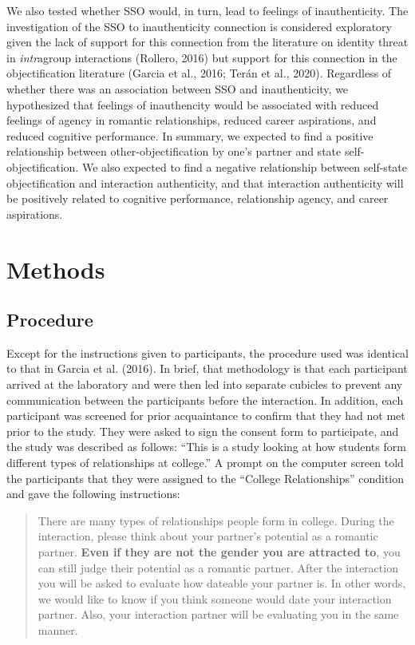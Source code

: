 \documentclass[man]{apa6}
\begin{document}
We also tested whether SSO would, in turn, lead to feelings of
inauthenticity. The investigation of the SSO to inauthenticity
connection is considered exploratory given the lack of support for this
connection from the literature on identity threat in \emph{intr}agroup
interactions (Rollero, 2016) but support for this connection in the
objectification literature (Garcia et al., 2016; Terán et al., 2020).
Regardless of whether there was an association between SSO and
inauthenticity, we hypothesized that feelings of inauthencity would be
associated with reduced feelings of agency in romantic relationships,
reduced career aspirations, and reduced cognitive performance. In
summary, we expected to find a positive relationship between
other-objectification by one's partner and state self-objectification.
We also expected to find a negative relationship between self-state
objectification and interaction authenticity, and that interaction
authenticity will be positively related to cognitive performance,
relationship agency, and career aspirations.

\section{Methods}\label{methods}

\subsection{Procedure}\label{procedure}

Except for the instructions given to participants, the procedure used
was identical to that in Garcia et al. (2016). In brief, that
methodology is that each participant arrived at the laboratory and were
then led into separate cubicles to prevent any communication between the
participants before the interaction. In addition, each participant was
screened for prior acquaintance to confirm that they had not met prior
to the study. They were asked to sign the consent form to participate,
and the study was described as follows: \enquote{This is a study looking
at how students form different types of relationships at college.} A
prompt on the computer screen told the participants that they were
assigned to the \enquote{College Relationships} condition and gave the
following instructions:

\begin{quote}
There are many types of relationships people form in college. During the
interaction, please think about your partner's potential as a romantic
partner. \textbf{Even if they are not the gender you are attracted to},
you can still judge their potential as a romantic partner. After the
interaction you will be asked to evaluate how dateable your partner is.
In other words, we would like to know if you think someone would date
your interaction partner. Also, your interaction partner will be
evaluating you in the same manner.
\end{quote}
\end{document}
